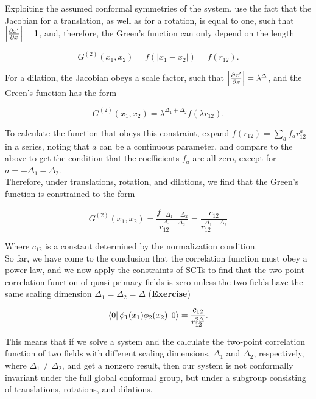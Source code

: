 \noindent Exploiting the assumed conformal symmetries of the system, use the fact that the Jacobian for a translation, as well as for a rotation, is equal to one, such that $\Big{|} \frac{\partial x'}{\partial x} \Big{|} = 1$, and, therefore, the Green's function can only depend on the length 

\begin{equation}
G^{(2)} (x_1, x_2) = f(|x_1 - x_2|) = f(r_{12}).
\end{equation}

\noindent For a dilation, the Jacobian obeys a scale factor, such that $\Big{|} \frac{\partial x'}{\partial x} \Big{|} = \lambda^{\Delta}$, and the Green's function has the form

\begin{equation}
G^{(2)} (x_1, x_2) = \lambda^{\Delta_1 + \Delta_2} f(\lambda r_{12}).
\end{equation}

\noindent To calculate the function that obeys this constraint, expand $f(r_{12}) = \sum_a f_a r_{12}^a$ in a series, noting that $a$ can be a continuous parameter, and compare to the above to get the condition that the coefficients $f_a$ are all zero, except for $a = -\Delta_1 - \Delta_2$. \\

\noindent Therefore, under translations, rotation, and dilations, we find that the Green's function is constrained to the form

\begin{equation}
G^{(2)} (x_1, x_2) = \frac{f_{-\Delta_1 - \Delta_2}}{r_{12}^{\Delta_1 + \Delta_2}} = \frac{c_{12}}{r_{12}^{\Delta_1 + \Delta_2}}
\end{equation}

\noindent Where $c_{12}$ is a constant determined by the normalization condition. \\

\noindent So far, we have come to the conclusion that the correlation function must obey a power law, and we now apply the constraints of SCTs to find that the two-point correlation function of quasi-primary fields is zero unless the two fields have the same scaling dimension $\Delta_1 = \Delta_2 = \Delta$ (\textbf{Exercise})

\begin{equation}
\bra{0} \phi_1 (x_1) \phi_2 (x_2) \ket{0} = \frac{c_{12}}{r_{12}^{2\Delta}}.
\end{equation}

\noindent This means that if we solve a system and the calculate the two-point correlation function of two fields with different scaling dimensions, $\Delta_1$ and $\Delta_2$, respectively, where $\Delta_1 \ne \Delta_2$, and get a nonzero result, then our system is not conformally invariant under the full global conformal group, but under a subgroup consisting of translations, rotations, and dilations. \\

